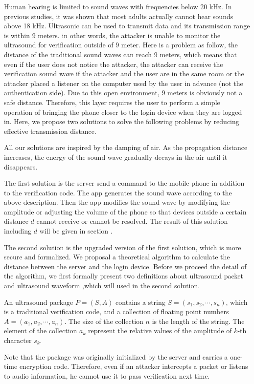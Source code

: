 Human hearing is limited to sound waves with frequencies below 20 kHz. In previous studies, it was shown that most adults actually cannot hear sounds above 18 kHz\cite{Vitello2006A}\cite{Deshotels2014Inaudible}. Ultrasonic can be used to transmit data and its transmission range is within 9 meters. in other words, the attacker is unable to monitor the ultrasound for verification outside of 9 meter. Here is a problem as follow, the distance of the traditional sound waves can reach 9 meters, which means that even if the user does not notice the attacker, the attacker can receive the verification sound wave if the attacker and the user are in the same room or the attacker placed a listener on the computer used by the user in advance (not the authentication side). Due to this open environment, 9 meters is obviously not a safe distance. Therefore, this layer requires the user to perform a simple operation of bringing the phone closer to the login device when they are logged in. Here, we propose two solutions to solve the following problems by reducing effective transmission distance. 


All our solutions are inspired by the damping of air\cite{damping}. As the propagation distance increases, the energy of the sound wave gradually decays in the air until it disappears. 



The first solution is the server send a command to the mobile phone in addition to the verification code. The app generates the sound wave according to the above description. Then the app modifies the sound wave by modifying the amplitude or adjusting the volume of the phone so that devices outside a certain distance $d$ cannot receive or cannot be resolved. The result of this solution including $d$ will be given in section \uppercase\expandafter{}.



The second solution is the upgraded version of the first solution, which is more secure and formalized. We proposal a theoretical algorithm to calculate the distance between the server and the login device. Before we proceed the detail of the algorithm, we first formally present two definitions about ultrasound packet and ultrasound waveform ,which will used in the second solution.



\begin{definition}\label{def:ultrasound packet}
An ultrasound package $P=(S, A)$ contains a string $S=(s_1,s_2,\cdots,s_n)$, which is a traditional verification code, and a collection of floating point numbers $A=(a_1, a_2,\cdots,a_n)$. The size of the collection $n$ is the length of the string. The element of the collection $a_k$ represent the relative values of the amplitude of $k$-th character $s_k$.

\end{definition}
Note that the package was originally initialized by the server and carries a one-time encryption code. Therefore, even if an attacker intercepts a packet or listens to audio information, he cannot use it to pass verification next time.

